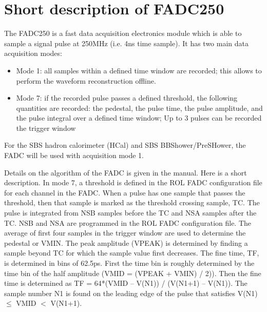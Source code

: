 \documentclass[11pt]{article}
\begin{document}



\section{Short description of FADC250}
The FADC250 is a fast data acquisition electronics module which is able to sample a signal pulse at 250MHz (i.e. 4ns time sample).
It has two main data acquisition modes:
%
\begin{itemize}
	\item{Mode 1: all samples within a defined time window are recorded; this allows to perform the waveform reconstruction offline.}
	\item{Mode 7: if the recorded pulse passes a defined threshold, the following quantities are recorded: the pedestal, the pulse time, the pulse amplitude, and the pulse integral over a defined time window; Up to 3 pulses can be recorded the trigger window}
\end{itemize}
%
For the SBS hadron calorimeter (HCal) and SBS BBShower/PreSHower, the FADC will be used with acquisition mode 1.

Details on the algorithm of the FADC is given in the manual. Here is a short description.
In mode 7, a threshold is defined in the ROL FADC  configuration file for each channel in the FADC. When a pulse has one sample that passes the threshold, then that sample is marked
as the threshold crossing sample, TC.  The pulse is integrated from NSB samples before the TC and NSA samples after the TC. NSB and NSA are programmed in the ROL FADC configuration file.
The average of first four samples in the trigger window are used to determine the pedestal or VMIN.
The peak amplitude (VPEAK) is determined by finding a sample beyond TC for which the sample value first decreases.
The fine time, TF,  is determined in bins of 62.5ps. First the time bin is roughly determined by the time bin of the half amplitude (VMID = (VPEAK + VMIN) / 2)).
Then the fine time is determined as TF = 64*(VMID – V(N1)) / (V(N1+1) – V(N1)). The sample number N1 is found on the leading edge of the pulse that satisfies
V(N1) $\leq$ VMID $<$ V(N1+1).
\end{document}
